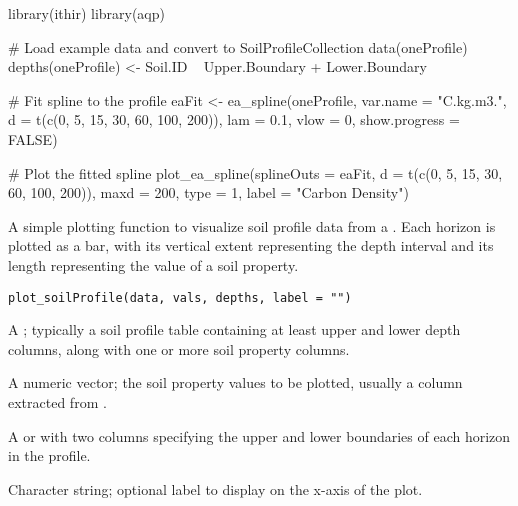 \documentclass[a4paper]{book}
\begin{document}
%
\begin{Examples}
\begin{ExampleCode}
library(ithir)
library(aqp)

# Load example data and convert to SoilProfileCollection
data(oneProfile)
depths(oneProfile) <- Soil.ID ~ Upper.Boundary + Lower.Boundary

# Fit spline to the profile
eaFit <- ea_spline(oneProfile, var.name = "C.kg.m3.", 
                   d = t(c(0, 5, 15, 30, 60, 100, 200)), 
                   lam = 0.1, vlow = 0, show.progress = FALSE)

# Plot the fitted spline
plot_ea_spline(splineOuts = eaFit, 
               d = t(c(0, 5, 15, 30, 60, 100, 200)), 
               maxd = 200, 
               type = 1, 
               label = "Carbon Density")
\end{ExampleCode}
\end{Examples}
%
\begin{Description}
A simple plotting function to visualize soil profile data from a . Each horizon is plotted as a bar, with its vertical extent representing the depth interval and its length representing the value of a soil property.
\end{Description}
%
\begin{Usage}
\begin{verbatim}
plot_soilProfile(data, vals, depths, label = "")
\end{verbatim}
\end{Usage}
%
\begin{Arguments}
\begin{ldescription}
\item[\code{data}] A ; typically a soil profile table containing at least upper and lower depth columns, along with one or more soil property columns.
\item[\code{vals}] A numeric vector; the soil property values to be plotted, usually a column extracted from .
\item[\code{depths}] A  or  with two columns specifying the upper and lower boundaries of each horizon in the profile.
\item[\code{label}] Character string; optional label to display on the x-axis of the plot.
\end{ldescription}
\end{Arguments}
\end{document}
